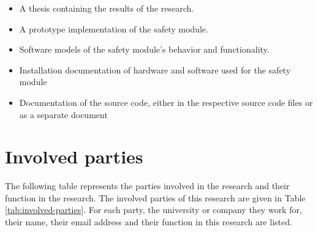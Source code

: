 \documentclass[12pt]{scrreprt}
\begin{document}
\begin{itemize}
    \item A thesis containing the results of the research.
    \item A prototype implementation of the safety module.
    \item Software models of the safety module's behavior and functionality.
    \item Installation documentation of hardware and software used for the safety module
    \item Documentation of the source code, either in the respective source code files or as a separate document
\end{itemize}

\section{Involved parties}
\label{Parties involved and communication scheme}
The following table represents the parties involved in the research and their function in the research.
The involved parties of this research are given in Table \ref{tab:involved-parties}. For each party, the university or company they work for, their name, their email address and their function in this research are listed.
\end{document}
